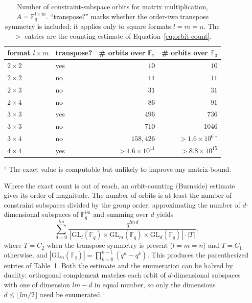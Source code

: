 \documentclass[11pt]{article}
\theoremstyle{definition}
\newcommand{\F}{\mathbb{F}}
\newcommand{\GL}{\mathrm{GL}}
\begin{document}
\begin{table}[!ht]
  \centering
  \setlength{\tabcolsep}{12pt}
  \begin{tabular}{llrr}
    \toprule
    format $l\times m$ & transpose? & \# orbits over $\F_2$ & \# orbits over $\F_3$          \\
    \midrule
    $2\times 2$        & yes        & $10$                  & $10$                           \\
    $2\times 2$        & no         & $11$                  & $11$                           \\
    $2\times 3$        & no         & $31$                  & $31$                           \\
    $2\times 4$        & no         & $86$                  & $91$                           \\
    $3\times 3$        & yes        & $496$                 & $736$                          \\
    $3\times 3$        & no         & $710$                 & $1046$                         \\
    $3\times 4$        & no         & $158{,}426$           & ${>}1.6\times10^{6}\,^\dagger$ \\
    $4\times 4$        & yes        & ${>}1.6\times10^{11}$ & ${>}8.8\times10^{15}$          \\
    \bottomrule
  \end{tabular}

  \smallskip
  {\footnotesize\raggedright
    $^\dagger$ The exact value is computable but unlikely to improve any matrix
  bound.\par}
  \caption{Number of constraint-subspace orbits for matrix multiplication,
    $A=\F_q^{l\times m}$. ``transpose?'' marks whether the order-two transpose
    symmetry is included; it applies only to square formats $l=m=n$. The ${>}$
  entries are the counting estimate of Equation~\eqref{eq:orbit-count}.}
  \label{tab:orbits}
\end{table}

Where the exact count is out of reach, an orbit-counting (Burnside) estimate gives
its order of magnitude. The number of orbits is at least the number of constraint
subspaces divided by the group order; approximating the number of $d$-dimensional
subspaces of $\F_q^{lm}$ and summing over $d$ yields
\begin{equation}\label{eq:orbit-count}
  \sum_{d=0}^{lm}
  \frac{q^{lm\,d}}{\,|\GL_l(\F_q)\times\GL_m(\F_q)\times\GL_d(\F_q)|\cdot|T|\,},
\end{equation}
where $T=C_2$ when the transpose symmetry is present ($l=m=n$) and $T=C_1$
otherwise, and $|\GL_n(\F_q)|=\prod_{k=0}^{n-1}(q^n-q^k)$. This produces the
parenthesized entries of Table~\ref{tab:orbits}. Both the estimate and the
enumeration can be halved by duality: orthogonal complement matches each orbit of
$d$-dimensional subspaces with one of dimension $lm-d$ in equal number, so only the
dimensions $d\le\lfloor lm/2\rfloor$ need be enumerated.
\end{document}
